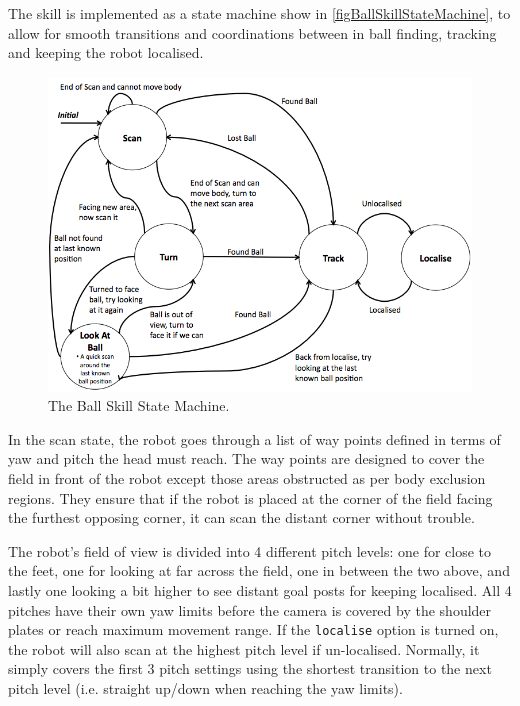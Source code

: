 \documentclass[pdftex,11pt,a4paper]{report}
\begin{document}
The skill is implemented as a state machine show in \autoref{figBallSkillStateMachine}, to allow for smooth transitions and coordinations between in ball finding, tracking and keeping the robot localised. 

\begin{figure}[ht]
\centering
\includegraphics[width=1.0\textwidth]{figures/BallSkillStateMachine.png}
\caption{The Ball Skill State Machine.} \label{figBallSkillStateMachine}
\end{figure} 

\label{ballSkillDescription}
In the scan state, the robot goes through a list of way points defined in terms of yaw and pitch the head must reach. The way points are designed to cover the field in front of the robot except those areas obstructed as per body exclusion regions. They ensure that if the robot is placed at the corner of the field facing the furthest opposing corner, it can scan the distant corner without trouble. 

The robot's field of view is divided into 4 different pitch levels: one for close to the feet, one for looking at far across the field, one in between the two above, and lastly one looking a bit higher to see distant goal posts for keeping localised. All 4 pitches have their own yaw limits before the camera is covered by the shoulder plates or reach maximum movement range. If the {\tt localise} option is turned on, the robot will also scan at the highest pitch level if un-localised. Normally, it simply covers the first 3 pitch settings using the shortest transition to the next pitch level (i.e. straight up/down when reaching the yaw limits).
\end{document}
